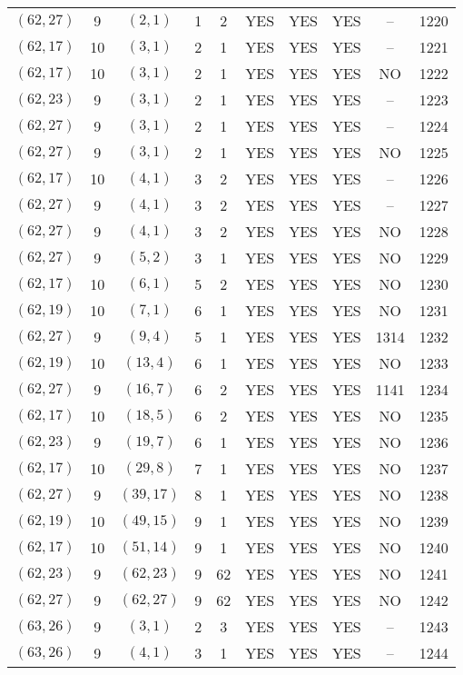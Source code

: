 \begin{longtable}{|c|c|c|c|c|c|c|c|c|c|}
$(62, 27)$ & 9 & $(2, 1)$ & 1 & 2 & YES & YES & YES & -- & 1220\\
$(62, 17)$ & 10 & $(3, 1)$ & 2 & 1 & YES & YES & YES & -- & 1221\\
$(62, 17)$ & 10 & $(3, 1)$ & 2 & 1 & YES & YES & YES & NO & 1222\\
$(62, 23)$ & 9 & $(3, 1)$ & 2 & 1 & YES & YES & YES & -- & 1223\\
$(62, 27)$ & 9 & $(3, 1)$ & 2 & 1 & YES & YES & YES & -- & 1224\\
$(62, 27)$ & 9 & $(3, 1)$ & 2 & 1 & YES & YES & YES & NO & 1225\\
$(62, 17)$ & 10 & $(4, 1)$ & 3 & 2 & YES & YES & YES & -- & 1226\\
$(62, 27)$ & 9 & $(4, 1)$ & 3 & 2 & YES & YES & YES & -- & 1227\\
$(62, 27)$ & 9 & $(4, 1)$ & 3 & 2 & YES & YES & YES & NO & 1228\\
$(62, 27)$ & 9 & $(5, 2)$ & 3 & 1 & YES & YES & YES & NO & 1229\\
$(62, 17)$ & 10 & $(6, 1)$ & 5 & 2 & YES & YES & YES & NO & 1230\\
$(62, 19)$ & 10 & $(7, 1)$ & 6 & 1 & YES & YES & YES & NO & 1231\\
$(62, 27)$ & 9 & $(9, 4)$ & 5 & 1 & YES & YES & YES & 1314 & 1232\\
$(62, 19)$ & 10 & $(13, 4)$ & 6 & 1 & YES & YES & YES & NO & 1233\\
$(62, 27)$ & 9 & $(16, 7)$ & 6 & 2 & YES & YES & YES & 1141 & 1234\\
$(62, 17)$ & 10 & $(18, 5)$ & 6 & 2 & YES & YES & YES & NO & 1235\\
$(62, 23)$ & 9 & $(19, 7)$ & 6 & 1 & YES & YES & YES & NO & 1236\\
$(62, 17)$ & 10 & $(29, 8)$ & 7 & 1 & YES & YES & YES & NO & 1237\\
$(62, 27)$ & 9 & $(39, 17)$ & 8 & 1 & YES & YES & YES & NO & 1238\\
$(62, 19)$ & 10 & $(49, 15)$ & 9 & 1 & YES & YES & YES & NO & 1239\\
$(62, 17)$ & 10 & $(51, 14)$ & 9 & 1 & YES & YES & YES & NO & 1240\\
$(62, 23)$ & 9 & $(62, 23)$ & 9 & 62 & YES & YES & YES & NO & 1241\\
$(62, 27)$ & 9 & $(62, 27)$ & 9 & 62 & YES & YES & YES & NO & 1242\\
$(63, 26)$ & 9 & $(3, 1)$ & 2 & 3 & YES & YES & YES & -- & 1243\\
$(63, 26)$ & 9 & $(4, 1)$ & 3 & 1 & YES & YES & YES & -- & 1244\\

\end{longtable}
